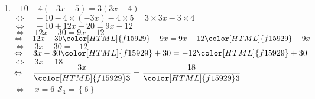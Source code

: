 \documentclass[a4paper,11pt,exos]{nsi} %
\begin{document}
\begin{enumerate}
    
    \item 	\begin{tabbing}
        $ -10-4(-3x+5)=3(3x-4) \quad$		\=	$\Leftrightarrow\quad -10-4\times (-3x)-4\times 5=3\times3x-3\times 4 $\\
        \>	$\Leftrightarrow\quad  	-10+12x-20=9x-12$\\
        \>	$\Leftrightarrow\quad  	12x-30=9x-12$\\
        \>	$\Leftrightarrow\quad  	12x-30{\color[HTML]{f15929}-9x}=9x-12{\color[HTML]{f15929}-9x} $\\
        \>	$\Leftrightarrow\quad	3x-30=-12 $\\
        \>	$\Leftrightarrow\quad	3x-30{\color[HTML]{f15929}+30}=-12{\color[HTML]{f15929}+30} $\\
        \>	$\Leftrightarrow\quad	3x=18 $\\
        \>	$\Leftrightarrow\quad	\dfrac{3x}{\color[HTML]{f15929}3}=\dfrac{18}{\color[HTML]{f15929}3} $\\
        \>	$\Leftrightarrow\quad	x=6 $ \hspace{4cm} $\mathcal{S}_3=\left\{ 6 \right\}$
    \end{tabbing}
    
\end{enumerate}
\end{document}
